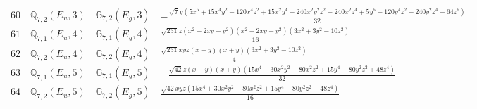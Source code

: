 \documentclass[fleqn,8pt,landscape]{jsarticle}
\begin{document}
\begin{table}[ht!]
\begin{center}
\begin{tabular}{cccl}
$ 60 $ & $ \mathbb{Q}_{7,2}(E_{u},3) $ & $ \mathbb{G}_{7,2}(E_{g},3) $ & $ - \frac{\sqrt{7} y \left(5 x^{6} + 15 x^{4} y^{2} - 120 x^{4} z^{2} + 15 x^{2} y^{4} - 240 x^{2} y^{2} z^{2} + 240 x^{2} z^{4} + 5 y^{6} - 120 y^{4} z^{2} + 240 y^{2} z^{4} - 64 z^{6}\right)}{32} $ \\
$ 61 $ & $ \mathbb{Q}_{7,1}(E_{u},4) $ & $ \mathbb{G}_{7,1}(E_{g},4) $ & $ \frac{\sqrt{231} z \left(x^{2} - 2 x y - y^{2}\right) \left(x^{2} + 2 x y - y^{2}\right) \left(3 x^{2} + 3 y^{2} - 10 z^{2}\right)}{16} $ \\
$ 62 $ & $ \mathbb{Q}_{7,2}(E_{u},4) $ & $ \mathbb{G}_{7,2}(E_{g},4) $ & $ \frac{\sqrt{231} x y z \left(x - y\right) \left(x + y\right) \left(3 x^{2} + 3 y^{2} - 10 z^{2}\right)}{4} $ \\
$ 63 $ & $ \mathbb{Q}_{7,1}(E_{u},5) $ & $ \mathbb{G}_{7,1}(E_{g},5) $ & $ - \frac{\sqrt{42} z \left(x - y\right) \left(x + y\right) \left(15 x^{4} + 30 x^{2} y^{2} - 80 x^{2} z^{2} + 15 y^{4} - 80 y^{2} z^{2} + 48 z^{4}\right)}{32} $ \\
$ 64 $ & $ \mathbb{Q}_{7,2}(E_{u},5) $ & $ \mathbb{G}_{7,2}(E_{g},5) $ & $ \frac{\sqrt{42} x y z \left(15 x^{4} + 30 x^{2} y^{2} - 80 x^{2} z^{2} + 15 y^{4} - 80 y^{2} z^{2} + 48 z^{4}\right)}{16} $ \\
 \hline \hline
\end{tabular}
\end{center}
\end{table}
\end{document}
